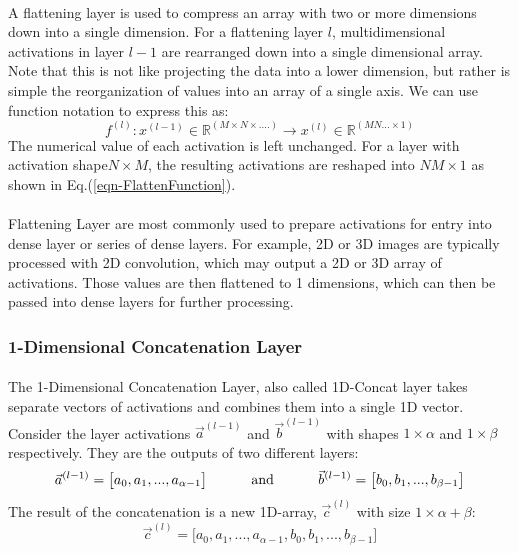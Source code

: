 \documentclass[12pt,letterpaper]{article}
\begin{document}
\paragraph*{}A flattening layer is used to compress an array with two or more dimensions down into a single dimension. For a flattening layer $l$, multidimensional activations in layer $l-1$ are rearranged down into a single dimensional array. Note that this is not like projecting the data into a lower dimension, but rather is simple the reorganization of values into an array of a single axis. We can use function notation to express this as:
\begin{equation}
\label{eqn-FlattenFunction}
f^{(l)} : x^{(l-1)} \in \mathbb{R}^{(M \times N \times ....)} \rightarrow
x^{(l)} \in \mathbb{R}^{(MN...\times 1)}
\end{equation}
The numerical value of each activation is left unchanged. For a layer with activation shape$N \times M$, the resulting activations are reshaped into $NM \times 1$ as shown in Eq.(\ref{eqn-FlattenFunction}).

\paragraph*{}Flattening Layer are most commonly used to prepare activations for entry into dense layer or series of dense layers. For example, 2D or 3D images are typically processed with 2D convolution, which may output a 2D or 3D array of activations. Those values are then flattened to 1 dimensions, which can then be passed into dense layers for further processing.


\subsubsection{1-Dimensional Concatenation Layer}
\label{subsubsec-1DConcat}

\paragraph*{}The 1-Dimensional Concatenation Layer, also called 1D-Concat layer takes separate vectors of activations and combines them into a single 1D vector. Consider the layer activations $\vec{a}^{(l-1)}$ and $\vec{b}^{(l-1)}$ with shapes  $1 \times \alpha$ and $1 \times \beta$ respectively. They are the outputs of two different layers:
\begin{equation}
\vec{a}^{(l-1)} = \big[ a_{0},  a_{1}, ... ,  a_{\alpha-1} \big]
\text{\hspace{1cm} and \hspace{1cm}}
\vec{b}^{(l-1)} = \big[ b_{0},  b_{1}, ... ,  b_{\beta-1} \big]
\end{equation}
The result of the concatenation is a new 1D-array, $\vec{c}^{(l)}$ with size $1 \times \alpha + \beta$:
\begin{equation}
\vec{c}^{(l)} = \big[ a_{0},  a_{1}, ... ,  a_{\alpha-1}, b_{0},  b_{1}, ... ,  b_{\beta-1} \big]
\end{equation}
\end{document}
